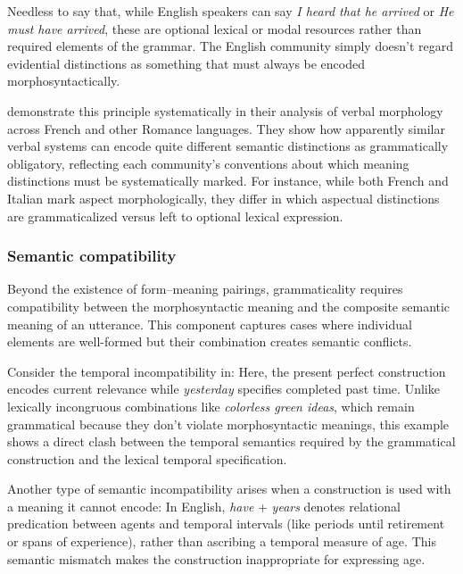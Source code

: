 \documentclass[12pt,letterpaper]{article}
\begin{document}
Needless to say that, while English speakers can say \textit{I heard that he arrived} or \textit{He must have arrived}, these are optional lexical or modal resources rather than required elements of the grammar. The English community simply doesn't regard evidential distinctions as something that must always be encoded morphosyntactically.

\textcite{kilani2005} demonstrate this principle systematically in their analysis of verbal morphology across French and other Romance languages. They show how apparently similar verbal systems can encode quite different semantic distinctions as grammatically obligatory, reflecting each community's conventions about which meaning distinctions must be systematically marked. For instance, while both French and Italian mark aspect morphologically, they differ in which aspectual distinctions are grammaticalized versus left to optional lexical expression.

\subsubsection{Semantic compatibility}\label{sec:semantic-compatibility}

Beyond the existence of form--meaning pairings, grammaticality requires compatibility between the morphosyntactic meaning and the composite semantic meaning of an utterance. This component captures cases where individual elements are well-formed but their combination creates semantic conflicts.

Consider the temporal incompatibility in:
\label{ex:tense-sem}
\z
Here, the present perfect construction encodes current relevance while \textit{yesterday} specifies completed past time. Unlike lexically incongruous combinations like \textit{colorless green ideas}, which remain grammatical because they don't violate morphosyntactic meanings, this example shows a direct clash between the temporal semantics required by the grammatical construction and the lexical temporal specification.

Another type of semantic incompatibility arises when a construction is used with a meaning it cannot encode:
\label{ex:have-years-sem}
\z
In English, \textit{have }+\textit{ years} denotes relational predication between agents and temporal intervals (like periods until retirement or spans of experience), rather than ascribing a temporal measure of age. This semantic mismatch makes the construction inappropriate for expressing age.
\end{document}
